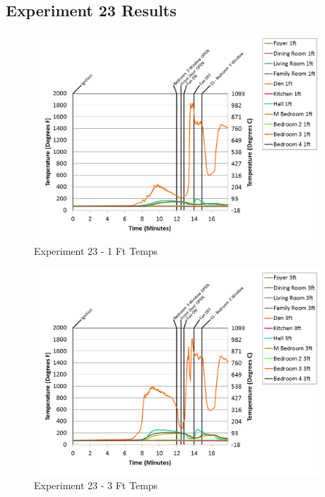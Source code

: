 \documentclass{article}
\begin{document}
\begin{appendices}
\clearpage
\clearpage		\large
\subsection{Experiment 23 Results} \label{App:Exp23Results} 

\begin{figure}[h!]
	\centering
	\includegraphics[height=3.05in]{0_Images/Results_Charts/Exp_23_Charts/1FtTemps.png}
	\caption{Experiment 23 - 1 Ft Temps}
\end{figure}


\begin{figure}[h!]
	\centering
	\includegraphics[height=3.05in]{0_Images/Results_Charts/Exp_23_Charts/3FtTemps.png}
	\caption{Experiment 23 - 3 Ft Temps}
\end{figure}

\clearpage


\end{appendices}
\end{document}
